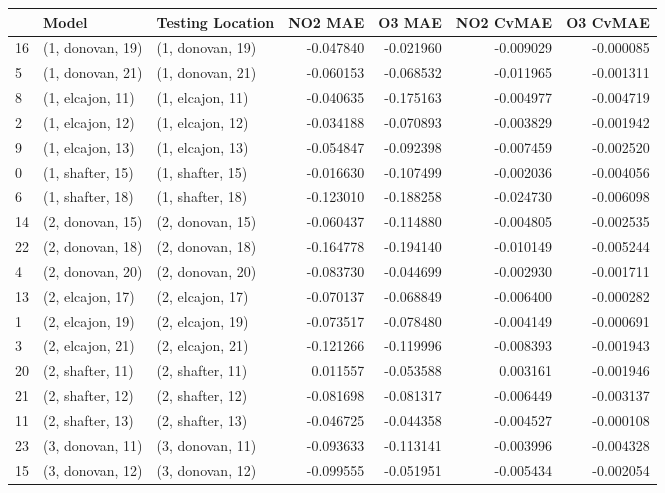 \begin{tabular}{lllrrrr}
\toprule
{} &             Model &  Testing Location &   NO2 MAE &    O3 MAE &  NO2 CvMAE &  O3 CvMAE \\
\midrule
16 &  (1, donovan, 19) &  (1, donovan, 19) & -0.047840 & -0.021960 &  -0.009029 & -0.000085 \\
5  &  (1, donovan, 21) &  (1, donovan, 21) & -0.060153 & -0.068532 &  -0.011965 & -0.001311 \\
8  &  (1, elcajon, 11) &  (1, elcajon, 11) & -0.040635 & -0.175163 &  -0.004977 & -0.004719 \\
2  &  (1, elcajon, 12) &  (1, elcajon, 12) & -0.034188 & -0.070893 &  -0.003829 & -0.001942 \\
9  &  (1, elcajon, 13) &  (1, elcajon, 13) & -0.054847 & -0.092398 &  -0.007459 & -0.002520 \\
0  &  (1, shafter, 15) &  (1, shafter, 15) & -0.016630 & -0.107499 &  -0.002036 & -0.004056 \\
6  &  (1, shafter, 18) &  (1, shafter, 18) & -0.123010 & -0.188258 &  -0.024730 & -0.006098 \\
14 &  (2, donovan, 15) &  (2, donovan, 15) & -0.060437 & -0.114880 &  -0.004805 & -0.002535 \\
22 &  (2, donovan, 18) &  (2, donovan, 18) & -0.164778 & -0.194140 &  -0.010149 & -0.005244 \\
4  &  (2, donovan, 20) &  (2, donovan, 20) & -0.083730 & -0.044699 &  -0.002930 & -0.001711 \\
13 &  (2, elcajon, 17) &  (2, elcajon, 17) & -0.070137 & -0.068849 &  -0.006400 & -0.000282 \\
1  &  (2, elcajon, 19) &  (2, elcajon, 19) & -0.073517 & -0.078480 &  -0.004149 & -0.000691 \\
3  &  (2, elcajon, 21) &  (2, elcajon, 21) & -0.121266 & -0.119996 &  -0.008393 & -0.001943 \\
20 &  (2, shafter, 11) &  (2, shafter, 11) &  0.011557 & -0.053588 &   0.003161 & -0.001946 \\
21 &  (2, shafter, 12) &  (2, shafter, 12) & -0.081698 & -0.081317 &  -0.006449 & -0.003137 \\
11 &  (2, shafter, 13) &  (2, shafter, 13) & -0.046725 & -0.044358 &  -0.004527 & -0.000108 \\
23 &  (3, donovan, 11) &  (3, donovan, 11) & -0.093633 & -0.113141 &  -0.003996 & -0.004328 \\
15 &  (3, donovan, 12) &  (3, donovan, 12) & -0.099555 & -0.051951 &  -0.005434 & -0.002054 \\

\end{tabular}
